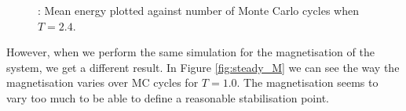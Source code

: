 \documentclass{article}
\begin{document}
{		\begin{figure}[H]
		\caption{: Mean energy plotted against number of Monte Carlo cycles when $T = 2.4$. }
		\label{fig:steady_E_highT}
		\end{figure}

		However, when we perform the same simulation for the magnetisation of the system, we get a different result. In Figure \ref{fig:steady_M} we can see the way the magnetisation varies over MC cycles for $T=1.0$. The magnetisation seems to vary too much to be able to define a reasonable stabilisation point.

}
\end{document}
